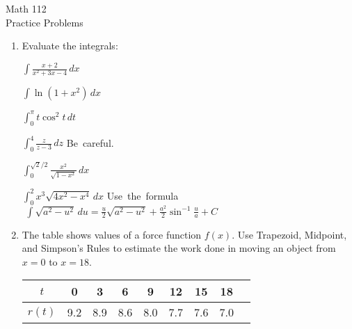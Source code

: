 \documentclass[11pt]{article}
\begin{document}
\begin{center}
\Large
\rm{Math 112}
\\
\rm{Practice Problems}
\\
\vspace{0.2in}

\end{center}


  \begin{enumerate}

  \item{Evaluate the integrals:

    \vspace{0.1in}
    
    $\int \frac{x+2}{x^2+3x-4} \, dx$

\vspace{0.2in}
    
        $\int \ln{(1+x^2)} \, dx$

\vspace{0.2in}
    
        $\int_0^{\pi} t\cos^2{t} \, dt$

\vspace{0.2in}
    
        $\int_0^4 \frac{z}{z-3} \, dz$  \hspace{0.8in} \mbox{Be careful.}

\vspace{0.2in}
    
        $\int_{0}^{\sqrt{2}/2} \frac{x^2}{\sqrt{1-x^2}} \, dx$

\vspace{0.2in}
    
     
$\int_0^2 x^3\sqrt{4x^2-x^4} \, dx$ \hspace{0.4in} \mbox{Use the formula} $\, \, \int \sqrt{a^2-u^2} \, du = \frac{u}{2}\sqrt{a^2-u^2}
+\frac{a^2}{2}\sin^{-1}{\frac{u}{a}} + C$
    
 
  }

    \vspace{0.1in}

\item{The table shows values of a force function $f(x)$.  Use Trapezoid, Midpoint, and Simpson's Rules to estimate the work done in moving an object from $x=0$ to $x=18.$}

  \vspace{0.15in}
  
\begin{tabular}{|c| c| c| c| c| c| c| c| c|} \hline
$t$ & 0 & 3 & 6 & 9 & 12 & 15 & 18  \\ 
\hline
$r(t)$ & 9.2 & 8.9 & 8.6 & 8.0 & 7.7 & 7.6 & 7.0 \\ 
\hline
\end{tabular}


\end{enumerate}
\end{document}
